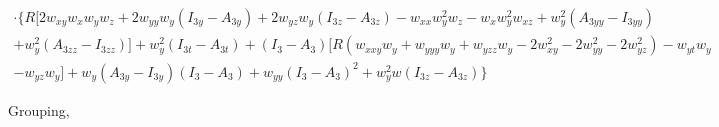 \documentclass[12pt,a4paper]{article}
\begin{document}
\begin{multline}
      \cdot \biggl\{ R [ 2 w_{xy} w_x w_y w_z
	  + 2 w_{yy} w_y \left( I_{3y} - A_{3y} \right) + 2 w_{yz} w_y \left( I_{3z} - A_{3z} \right)
	  - w_{xx} w_y^2 w_z - w_x w_y^2 w_{xz}
	  + w_y^2 \left( A_{3yy} - I_{3yy} \right) \\
	  + w_y^2 \left( A_{3zz} - I_{3zz} \right) ]
	  + w_y^2 \left(I_{3t} - A_{3t}\right) + \left(I_3 - A_3\right) \biggl[ R \left( w_{xxy} w_y + w_{yyy} w_y + w_{yzz} w_y - 2 w_{xy}^2 - 2 w_{yy}^2 - 2 w_{yz}^2 \right) - w_{yt} w_y \\
	  - w_{yz} w_y \biggr]
	  + w_y \left(A_{3y} - I_{3y}\right)\left(I_3 - A_3\right) + w_{yy} \left(I_3 - A_3\right)^2
	  + w_y^2 w \left(I_{3z} - A_{3z}\right) \biggr\}
	\end{multline}

  Grouping,

    \footnotesize %
\end{document}
